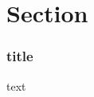\documentclass[12pt,t]{beamer}
\begin{document}
\section{Section}
\begin{frame}
\frametitle{title}
text
\end{frame}
\end{document}
